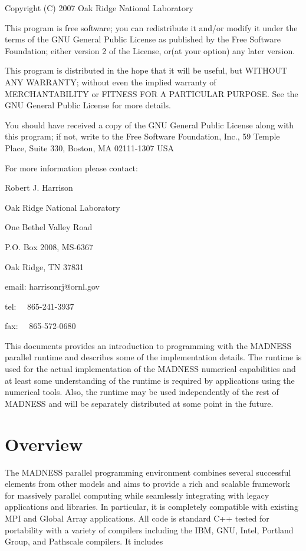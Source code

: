 \documentclass[letterpaper]{article}
\begin{document}
Copyright (C) 2007 Oak Ridge National Laboratory

This program is free software; you can redistribute it and/or modify it under the terms of the GNU General Public
License as published by the Free Software Foundation; either version 2 of the License, or(at your option) any later
version.

This program is distributed in the hope that it will be useful, but WITHOUT ANY WARRANTY; without even the implied
warranty of MERCHANTABILITY or FITNESS FOR A PARTICULAR PURPOSE. See the GNU General Public License for more details.

You should have received a copy of the GNU General Public License along with this program; if not, write to the Free
Software Foundation, Inc., 59 Temple Place, Suite 330, Boston, MA 02111-1307 USA

For more information please contact:

Robert J. Harrison

Oak Ridge National Laboratory

One Bethel Valley Road

P.O. Box 2008, MS-6367

Oak Ridge, TN 37831


\bigskip

email: harrisonrj@ornl.gov 

tel: \ \ 865-241-3937

fax: \ \ 865-572-0680

\setcounter{tocdepth}{10}
\renewcommand\contentsname{Table of Contents}
\tableofcontents

\bigskip

\clearpage
\bigskip

\clearpage\setcounter{page}{1}\pagestyle{LeftPage}
\thispagestyle{Firstrightnumberedpage}

This documents provides an introduction to programming with the MADNESS parallel runtime and describes some of the
implementation details. The runtime is used for the actual implementation of the MADNESS numerical capabilities and at
least some understanding of the runtime is required by applications using the numerical tools. Also, the runtime may be
used independently of the rest of MADNESS and will be separately distributed at some point in the future.

\section{Overview}
The MADNESS parallel programming environment combines several successful elements from other models and aims to provide
a rich and scalable framework for massively parallel computing while seamlessly integrating with legacy applications
and libraries. In particular, it is completely compatible with existing MPI and Global Array applications. All code is
standard C++ tested for portability with a variety of compilers including the IBM, GNU, Intel, Portland Group, and
Pathscale compilers. It includes
\end{document}

